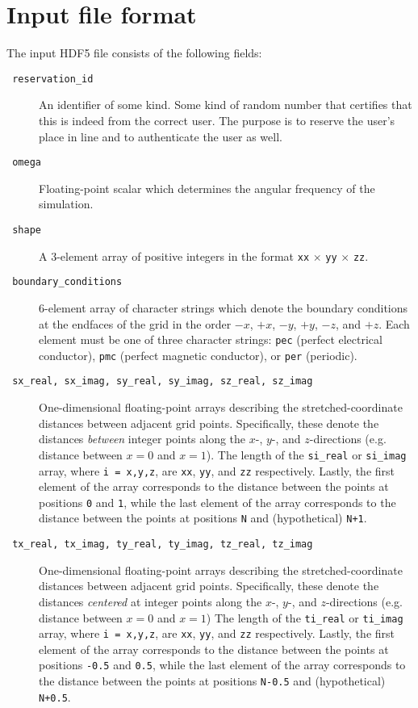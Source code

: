 \documentclass{article}
\newcommand{\I}[1]{\item[\texttt{ #1 }]}
\newcommand{\T}{\texttt}
\begin{document}
\section{Input file format}
The input HDF5 file consists of the following fields:
\begin{description}
\I  {reservation\_id} 
    An identifier of some kind.
    Some kind of random number that certifies that this is indeed from the
        correct user.
    The purpose is to reserve the user's place in line and to authenticate
        the user as well.

\I  {omega}
    Floating-point scalar which determines the angular frequency
        of the simulation.

\I  {shape} 
    A 3-element array of positive integers in the format 
        \T{xx} $\times$ \T{yy} $\times$ \T{zz}.

\I  {boundary\_conditions}
    6-element array of character strings which denote the boundary conditions 
        at the endfaces of the grid in the order 
        $-x$, $+x$, $-y$, $+y$, $-z$, and $+z$.
    Each element must be one of three character strings: 
        \T{pec} (perfect electrical conductor), 
        \T{pmc} (perfect magnetic conductor), or 
        \T{per} (periodic).

\I  {sx\_real, sx\_imag, sy\_real, sy\_imag, sz\_real, sz\_imag}
    One-dimensional floating-point arrays describing the stretched-coordinate
        distances between adjacent grid points.
    Specifically, these denote the distances \emph{between} integer points 
        along the $x$-, $y$-, and $z$-directions 
        (e.g. distance between $x = 0$ and $x = 1$).
    The length of the \T{si\_real} or \T{si\_imag} array,
        where \T{i = x,y,z},
        are \T{xx}, \T{yy}, and \T{zz} respectively.
    Lastly, the first element of the array corresponds to the distance between
        the points at positions \T{0} and \T{1},
        while the last element of the array corresponds to the distance between
        the points at positions \T{N} and (hypothetical) \T{N+1}.

\I  {tx\_real, tx\_imag, ty\_real, ty\_imag, tz\_real, tz\_imag}
    One-dimensional floating-point arrays describing the stretched-coordinate
        distances between adjacent grid points.
    Specifically, these denote the distances \emph{centered} at integer points 
        along the $x$-, $y$-, and $z$-directions
        (e.g. distance between $x = 0$ and $x = 1$)
    The length of the \T{ti\_real} or \T{ti\_imag} array,
        where \T{i = x,y,z},
        are \T{xx}, \T{yy}, and \T{zz} respectively.
    Lastly, the first element of the array corresponds to the distance between
        the points at positions \T{-0.5} and \T{0.5},
        while the last element of the array corresponds to the distance between
        the points at positions \T{N-0.5} and (hypothetical) \T{N+0.5}.


\end{description}
\end{document}
